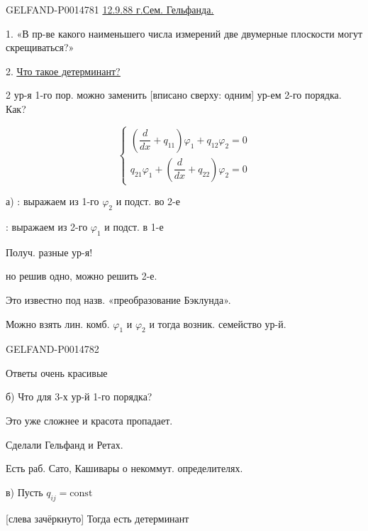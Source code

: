 \begin{GelfandAdjacentEvidence}{GELFAND-P001478}{1}
\underline{12.9.88 г.}\qquad \underline{\underline{Сем. Гельфанда.}}

1. «В пр-ве какого наименьшего числа измерений две двумерные плоскости могут скрещиваться?»

2. \underline{\underline{Что такое детерминант?}}

2 ур-я 1-го пор. можно заменить [вписано сверху: одним] ур-ем 2-го порядка. Как?

\begin{equation*}
\begin{cases}
\left(\dfrac{d}{dx}+q_{11}\right)\varphi_1+q_{12}\varphi_2=0\\
q_{21}\varphi_1+\left(\dfrac{d}{dx}+q_{22}\right)\varphi_2=0
\end{cases}
\tag{1}
\end{equation*}

а) : выражаем из 1-го \(\varphi_2\) и подст. во 2-е

: выражаем из 2-го \(\varphi_1\) и подст. в 1-е

Получ. разные ур-я!

но решив одно, можно решить 2-е.

Это известно под назв. «преобразование Бэклунда».

Можно взять лин. комб. \(\varphi_1\) и \(\varphi_2\) и тогда возник. семейство ур-й.
\end{GelfandAdjacentEvidence}
\begin{GelfandAdjacentEvidence}{GELFAND-P001478}{2}


Ответы очень красивые

б) Что для 3-х ур-й 1-го порядка?

Это уже сложнее и красота пропадает.

Сделали Гельфанд и Ретах.

Есть раб. Сато, Кашивары о некоммут. определителях.

в) Пусть \(q_{ij}=\mathrm{const}\)

[слева зачёркнуто] Тогда есть детерминант
\end{GelfandAdjacentEvidence}
